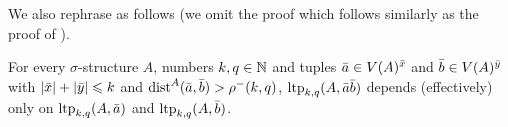 We also rephrase  as follows (we omit the proof which follows similarly as the proof of ).
\begin{lemma}\label{lem:far-ltp'}
    For every $\sigma$-structure $A$, numbers $k,q\in \mathbb N$ and 
    tuples 
    $\bar a\in V(A)^{\bar x}$ and $\bar b\in V(A)^{\bar y}$ with $|\bar x|+|\bar y|\leqslant k$ 
    and $\mathrm{dist}^A(\bar a,\bar b)>\rho^-(k,q)$,
    $\textnormal{ltp}_{k,q}(A,\bar a\bar b)$ depends (effectively) only on $\textnormal{ltp}_{k,q}(A,\bar a)$
    and $\textnormal{ltp}_{k,q}(A,\bar b)$.
\end{lemma}







